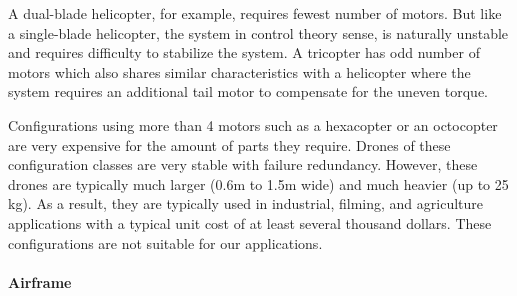 A dual-blade helicopter, for example, requires fewest number of motors. But like a single-blade helicopter, the system in control theory sense, is naturally unstable and requires difficulty to stabilize the system. A tricopter has odd number of motors which also shares similar characteristics with a helicopter where the system requires an additional tail motor to compensate for the uneven torque. 

Configurations using more than 4 motors such as a hexacopter or an octocopter are very expensive for the amount of parts they require. Drones of these configuration classes are very stable with failure redundancy. However, these drones are typically much larger (0.6m to 1.5m wide) and much heavier (up to 25 kg). As a result, they are typically used in industrial, filming, and agriculture applications with a typical unit cost of at least several thousand dollars. These configurations are not suitable for our applications.

\paragraph{Airframe}

